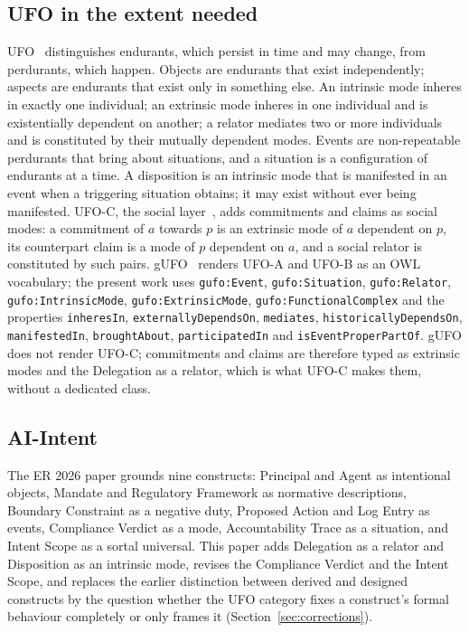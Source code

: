 \documentclass[runningheads]{llncs}
\newcommand{\code}[1]{\texttt{#1}}
\begin{document}
\subsection{UFO in the extent needed}
\label{sec:ufo}
UFO~\cite{guizzardi2005ontological,guizzardi2013events} distinguishes endurants, which persist in time and may change, from perdurants, which happen. Objects are endurants that exist independently; aspects are endurants that exist only in something else. An intrinsic mode inheres in exactly one individual; an extrinsic mode inheres in one individual and is existentially dependent on another; a relator mediates two or more individuals and is constituted by their mutually dependent modes. Events are non-repeatable perdurants that bring about situations, and a situation is a configuration of endurants at a time. A disposition is an intrinsic mode that is manifested in an event when a triggering situation obtains; it may exist without ever being manifested. UFO-C, the social layer~\cite{guizzardi2008ufoc,nardi2015commitment}, adds commitments and claims as social modes: a commitment of $a$ towards $p$ is an extrinsic mode of $a$ dependent on $p$, its counterpart claim is a mode of $p$ dependent on $a$, and a social relator is constituted by such pairs. gUFO~\cite{almeida2019gufo} renders UFO-A and UFO-B as an OWL vocabulary; the present work uses \code{gufo:Event}, \code{gufo:Situation}, \code{gufo:Relator}, \code{gufo:IntrinsicMode}, \code{gufo:ExtrinsicMode}, \code{gufo:FunctionalComplex} and the properties \code{inheresIn}, \code{externallyDependsOn}, \code{mediates}, \code{historicallyDependsOn}, \code{manifestedIn}, \code{broughtAbout}, \code{participatedIn} and \code{isEventProperPartOf}. gUFO does not render UFO-C; commitments and claims are therefore typed as extrinsic modes and the Delegation as a relator, which is what UFO-C makes them, without a dedicated class.

\subsection{AI-Intent}
\label{sec:aiintent}
The ER 2026 paper grounds nine constructs: Principal and Agent as intentional objects, Mandate and Regulatory Framework as normative descriptions, Boundary Constraint as a negative duty, Proposed Action and Log Entry as events, Compliance Verdict as a mode, Accountability Trace as a situation, and Intent Scope as a sortal universal. This paper adds Delegation as a relator and Disposition as an intrinsic mode, revises the Compliance Verdict and the Intent Scope, and replaces the earlier distinction between derived and designed constructs by the question whether the UFO category fixes a construct's formal behaviour completely or only frames it (Section~\ref{sec:corrections}).
\end{document}
